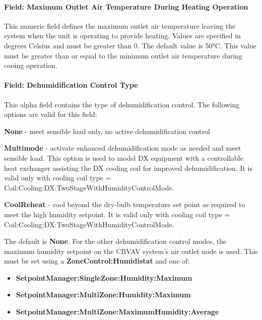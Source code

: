 \paragraph{Field: Maximum Outlet Air Temperature During Heating Operation}\label{field-maximum-outlet-air-temperature-during-heating-operation}

This numeric field defines the maximum outlet air temperature leaving the system when the unit is operating to provide heating. Values are specified in degrees Celsius and must be greater than 0. The default value is 50°C. This value must be greater than or equal to the minimum outlet air temperature during cooing operation.

\paragraph{Field: Dehumidification Control Type}\label{field-dehumidification-control-type-5-000}

This alpha field contains the type of dehumidification control. The following options are valid for this field:

\textbf{None} - meet sensible load only, no active dehumidification control

\textbf{Multimode} - activate enhanced dehumidification mode as needed and meet sensible load. This option is used to model DX equipment with a controllable heat exchanger assisting the DX cooling coil for improved dehumidification. It is valid only with cooling coil type = Coil:Cooling:DX:TwoStageWithHumidityControlMode.

\textbf{CoolReheat} - cool beyond the dry-bulb temperature set point as required to meet the high humidity setpoint. It is valid only with cooling coil type = Coil:Cooling:DX:TwoStageWithHumidityControlMode.

The default is \textbf{None}. For the other dehumidification control modes, the maximum humidity setpoint on the CBVAV system's air outlet node is used. This must be set using a \textbf{ZoneControl:Humidistat} and one of:

\begin{itemize}
\item
  \textbf{SetpointManager:SingleZone:Humidity:Maximum}
\item
  \textbf{SetpointManager:MultiZone:Humidity:Maximum}
\item
  \textbf{SetpointManager:MultiZone:MaximumHumidity:Average}
\end{itemize}

